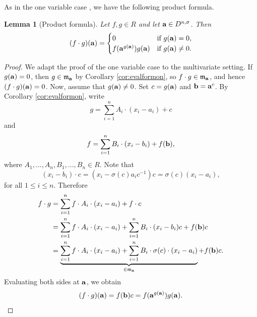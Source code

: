 \documentclass[11pt,reqno]{amsart}
\newtheorem{lem}[thm]{Lemma}
\theoremstyle{definition}
\begin{document}
As in the one variable case \cite{VL88}, we have the following product formula.
\begin{lem}[Product formula]\label{lem:prodformskewmult}
Let $f,g \in R$ and let ${\bf a} \in D^{n,\sigma}$. Then
$$
(f \cdot g)({\bf a})=
\begin{cases}
0 & \textrm{if}\,\, g({\bf a})=0,\\
f({\bf a}^{g({\bf a})})g({\bf a}) &\textrm{if}\,\, g({\bf a}) \neq 0. 
\end{cases}
$$
\end{lem}
\begin{proof}
We adapt the proof of the one variable case \cite[Theorem 2.7]{VL88} to the multivariate setting. If $g({\bf a})=0$, then $g \in \mathfrak{m}_{{\bf a}}$ by Corollary \ref{cor:evalformon}, so $f \cdot g \in \mathfrak{m}_{{\bf a}}$, and hence $(f\cdot g)({\bf a})=0$. Now, assume that $g({\bf a}) \neq 0$. Set $c=g({\bf a})$ and ${\bf b}={\bf a}^{c}$. By Corollary \ref{cor:evalformon}, write
$$
g=\sum_{i=1}^n A_i\cdot (x_i-a_i)+c
$$
and
$$
f=\sum_{i=1}^n B_i\cdot (x_i-b_i)+f({\bf b}),
$$ where $A_1,\dots,A_n, B_1,\dots,B_n \in R$. Note that
$$
(x_i-b_i)\cdot c=(x_i-\sigma(c) a_i c^{-1})c=\sigma(c)(x_i-a_i),
$$ for all $1 \leq i \leq n$.
Therefore
\begin{align*}
f\cdot g&=\sum_{i=1}^nf \cdot A_i \cdot (x_i-a_i)+f \cdot c\\
&=\sum_{i=1}^n f\cdot A_i \cdot (x_i-a_i)+\sum_{i=1}^n B_i \cdot (x_i-b_i)c +f({\bf b})c\\
   &=\underbrace{\sum_{i=1}^n f\cdot A_i \cdot (x_i-a_i)+\sum_{i=1}^n B_i \cdot \sigma(c) \cdot (x_i-a_i)}_{\in \mathfrak{m}_{{\bf a}}} +f({\bf b})c.
\end{align*}
Evaluating both sides at ${\bf a}$, we obtain
$$
(f \cdot g)({\bf a})=f({\bf b})c=f({\bf a}^{g({\bf a})})g({\bf a}).
$$
\end{proof}
\end{document}
